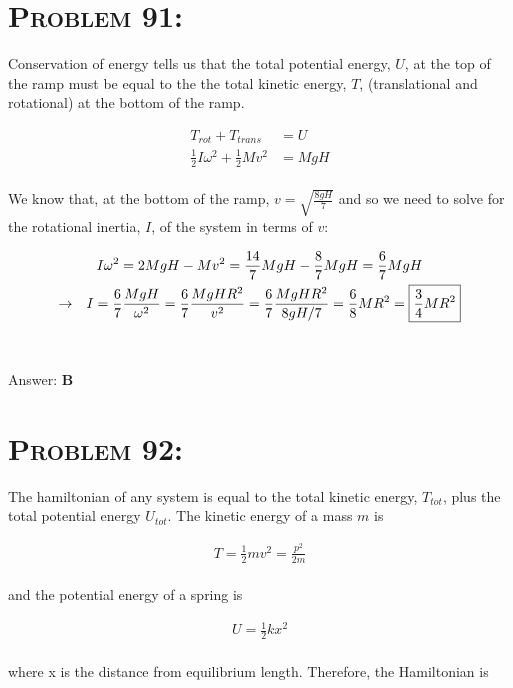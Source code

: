 \documentclass{article}
\begin{document}

\section{\textsc{Problem 91:}} Conservation of energy tells us that the total potential energy, $U$, at the top of the ramp must be equal to the the total kinetic energy, $T$, (translational and rotational) at the bottom of the ramp.

\begin{align}
T_{rot} + T_{trans} &= U \nonumber\\
\frac{1}{2} I \omega^{2} + \frac{1}{2} M v^{2} &= MgH\nonumber
\end{align}
\\
We know that, at the bottom of the ramp, $v = \sqrt{\frac{8gH}{7}}$ and so we need to solve for the rotational inertia, $I$,  of the system in terms of $v$:

\begin{gather}
I\omega^{2} = 2 M g H - Mv^{2} = \frac{14}{7} MgH - \frac{8}{7} M g H = \frac{6}{7} MgH\nonumber\\
\rightarrow \hspace{.1in} I = \frac{6}{7} \frac{MgH }{\omega^{2}} = \frac{6}{7}  \frac{MgHR^{2}}{v^{2}} = \frac{6}{7} \frac{MgHR^{2}}{8gH/7} = \frac{6}{8} MR^{2} = \boxed{\frac{3}{4} MR^{2}} \nonumber
\end{gather}
\\\\
Answer: \textbf{\textcolor{ProcessBlue}B}\\


\section{\textsc{Problem 92:}} The hamiltonian of any system is equal to the total kinetic energy, $T_{tot}$, plus the total potential energy $U_{tot}$. The kinetic energy of a mass $m$ is

\begin{gather}
T = \frac{1}{2}mv^{2} = \frac{p^{2}}{2m}
\end{gather}
\\
and the potential energy of a spring is

\begin{gather}
U = \frac{1}{2}kx^{2}
\end{gather}
\\
where x is the distance from equilibrium length. Therefore, the Hamiltonian is
\end{document}
